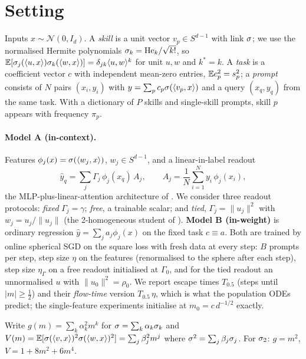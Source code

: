 \section{Setting}
\label{sec:setup}
Inputs $x\sim\mathcal N(0,I_d)$. A \emph{skill} is a unit vector $v_p\in S^{d-1}$ with link $\sigma$; we use the normalised Hermite
polynomials $\sigma_k=\mathrm{He}_k/\sqrt{k!}$, so $\mathbb{E}[\sigma_j(\langle u,x\rangle)\sigma_k(\langle w,x\rangle)]=\delta_{jk}\langle u,w\rangle^k$ for unit
$u,w$ and $k^*=k$. A \emph{task} is a coefficient vector $c$ with independent mean-zero entries, $\mathbb{E} c_p^2=s_p^2$; a \emph{prompt}
consists of $N$ pairs $(x_i,y_i)$ with $y=\sum_p c_p\sigma(\langle v_p,x\rangle)$ and a query $(x_q,y_q)$ from the same task. With a
dictionary of $P$ skills and single-skill prompts, skill $p$ appears with frequency $\pi_p$.

\paragraph{Model A (in-context).} Features $\phi_j(x)=\sigma(\langle w_j,x\rangle)$, $w_j\in S^{d-1}$, and a linear-in-label readout
\begin{equation}
\hat y_q=\sum_j\Gamma_j\,\phi_j(x_q)\,A_j,\qquad A_j=\frac1N\sum_{i=1}^N y_i\,\phi_j(x_i),
\label{eq:modelA}
\end{equation}
the MLP-plus-linear-attention architecture of \citet{oko2024pretrained}. We consider three readout protocols: \emph{fixed}
$\Gamma_j=\gamma$; \emph{free}, a trainable scalar; and \emph{tied}, $\Gamma_j=\|u_j\|^2$ with $w_j=u_j/\|u_j\|$ (the 2-homogeneous
student of \citet{ren2025emergence}). \textbf{Model B (in-weight)} is ordinary regression $\hat y=\sum_j a_j\phi_j(x)$ on the fixed
task $c\equiv a$. Both are trained by online spherical SGD on the square loss with fresh data at every step: $B$ prompts per step, step size
$\eta$ on the features (renormalised to the sphere after each step), step size $\eta_\Gamma$ on a free readout initialised at $\Gamma_0$,
and for the tied readout an unnormalised $u$ with $\|u_0\|^2=\rho_0$. We report escape times $T_{0.5}$ (steps until $|m|\ge\tfrac12$) and
their \emph{flow-time} version $T_{0.5}\,\eta$, which is what the population ODEs predict; the single-feature experiments initialise
at $m_0=c\,d^{-1/2}$ exactly.

Write $g(m)=\sum_k\alpha_k^2m^k$ for $\sigma=\sum_k\alpha_k\sigma_k$ and $V(m)=\mathbb{E}[\sigma(\langle v,x\rangle)^2\sigma(\langle w,x\rangle)^2]=\sum_j\beta_j^2m^j$
where $\sigma^2=\sum_j\beta_j\sigma_j$. For $\sigma_2$: $g=m^2$, $V=1+8m^2+6m^4$.

